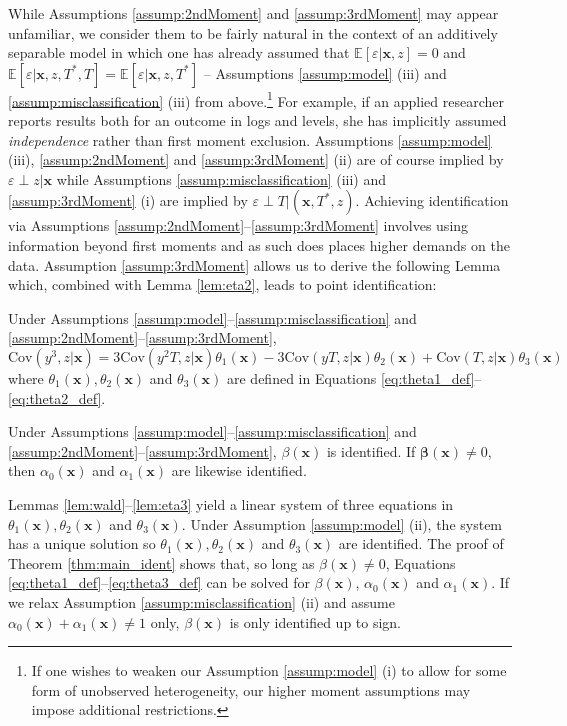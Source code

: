 While Assumptions \ref{assump:2ndMoment} and \ref{assump:3rdMoment} may appear unfamiliar, we consider them to be fairly natural in the context of an additively separable model in which one has already assumed that $\mathbb{E}[\varepsilon|\mathbf{x},z]=0$ and $\mathbb{E}[\varepsilon|\mathbf{x},z,T^*,T] = \mathbb{E}[\varepsilon|\mathbf{x},z,T^*]$ -- Assumptions \ref{assump:model} (iii) and \ref{assump:misclassification} (iii) from above.\footnote{If one wishes to weaken our Assumption \ref{assump:model} (i) to allow for some form of unobserved heterogeneity, our higher moment assumptions may impose additional restrictions.}
For example, if an applied researcher reports results both for an outcome in logs and levels, she has implicitly assumed \emph{independence} rather than first moment exclusion. 
Assumptions \ref{assump:model} (iii), \ref{assump:2ndMoment} and \ref{assump:3rdMoment} (ii) are of course implied by $\varepsilon \perp z |\mathbf{x}$ while Assumptions \ref{assump:misclassification} (iii) and \ref{assump:3rdMoment} (i) are implied by $\varepsilon\perp T | (\mathbf{x}, T^*, z)$.
Achieving identification via Assumptions \ref{assump:2ndMoment}--\ref{assump:3rdMoment} involves using information beyond first moments and as such does places higher demands on the data.
Assumption \ref{assump:3rdMoment} allows us to derive the following Lemma which, combined with Lemma \ref{lem:eta2}, leads to point identification: 

\begin{lem}
  Under Assumptions \ref{assump:model}--\ref{assump:misclassification} and \ref{assump:2ndMoment}--\ref{assump:3rdMoment}, 
\[
    \mbox{Cov}(y^3,z|\mathbf{x}) = 3 \mbox{Cov}(y^2T,z|\mathbf{x}) \theta_1(\mathbf{x}) -3\mbox{Cov}(yT,z|\mathbf{x}) \theta_2(\mathbf{x}) + \mbox{Cov}(T,z|\mathbf{x}) \theta_3(\mathbf{x})
\]
where $\theta_1(\mathbf{x}),\theta_2(\mathbf{x})$ and $\theta_3(\mathbf{x})$ are defined in Equations \ref{eq:theta1_def}--\ref{eq:theta2_def}.
\label{lem:eta3}
\end{lem}

\begin{thm}
  Under Assumptions \ref{assump:model}--\ref{assump:misclassification} and \ref{assump:2ndMoment}--\ref{assump:3rdMoment}, $\beta(\mathbf{x})$ is identified.
  If $\mathbf{\beta}(\mathbf{x}) \neq 0$, then $\alpha_0(\mathbf{x})$ and $\alpha_1(\mathbf{x})$ are likewise identified.
  \label{thm:main_ident}
\end{thm}

Lemmas \ref{lem:wald}--\ref{lem:eta3} yield a linear system of three equations in $\theta_1(\mathbf{x}), \theta_2(\mathbf{x})$ and $\theta_3(\mathbf{x})$.
Under Assumption \ref{assump:model} (ii), the system has a unique solution so $\theta_1(\mathbf{x}), \theta_2(\mathbf{x})$ and $\theta_3(\mathbf{x})$ are identified.
The proof of Theorem \ref{thm:main_ident} shows that, so long as $\beta(\mathbf{x})\neq 0$, Equations \ref{eq:theta1_def}--\ref{eq:theta3_def} can be solved for $\beta(\mathbf{x})$, $\alpha_0(\mathbf{x})$ and $\alpha_1(\mathbf{x})$.
If we relax Assumption \ref{assump:misclassification} (ii) and assume $\alpha_0(\mathbf{x}) + \alpha_1(\mathbf{x}) \neq 1$ only, $\beta(\mathbf{x})$ is only identified up to sign.

